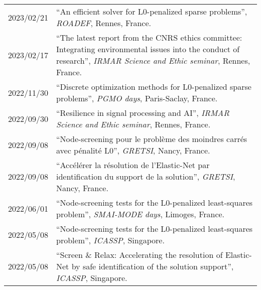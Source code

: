 \begin{longtable}[l]{@{}p{}p{}}
    2023/02/21 & ``An efficient solver for L0-penalized sparse problems'', \textit{ROADEF}, Rennes, France. \\
    2023/02/17 & ``The latest report from the CNRS ethics committee: Integrating environmental issues into the conduct of research'', \textit{IRMAR Science and Ethic seminar}, Rennes, France. \\
    2022/11/30 & ``Discrete optimization methods for L0-penalized sparse problems'', \textit{PGMO days}, Paris-Saclay, France. \\
    2022/09/30 & ``Resilience in signal processing and AI'', \textit{IRMAR Science and Ethic seminar}, Rennes, France. \\
    2022/09/08 & ``Node-screening pour le problème des moindres carrés avec pénalité L0'', \textit{GRETSI}, Nancy, France. \\
    2022/09/08 & ``Accélérer la résolution de l’Elastic-Net par identification du support de la solution'', \textit{GRETSI}, Nancy, France. \\
    2022/06/01 & ``Node-screening tests for the L0-penalized least-squares problem'', \textit{SMAI-MODE days}, Limoges, France. \\
    2022/05/08 & ``Node-screening tests for the L0-penalized least-squares problem'', \textit{ICASSP}, Singapore. \\
    2022/05/08 & ``Screen \& Relax: Accelerating the resolution of Elastic-Net by safe identification of the solution support'', \textit{ICASSP}, Singapore.
\end{longtable}